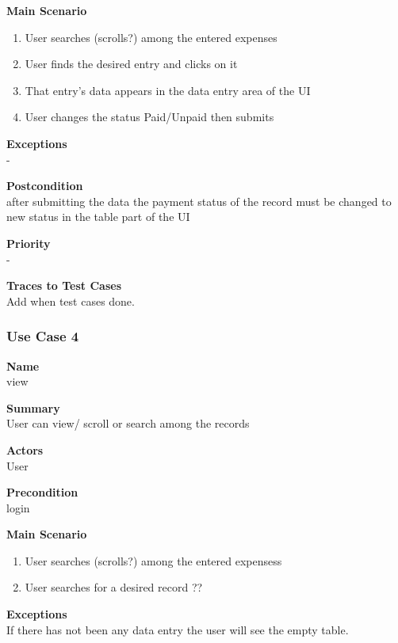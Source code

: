 \documentclass[12pt]{article}
\begin{document}
\noindent
{\bf Main Scenario}\\
\vspace*{-0.2in}
\begin{enumerate}
\item User searches (scrolls?)  among the entered expenses
\item User finds the desired entry and clicks on it
\item That entry’s data appears in the data entry area of the UI
\item User changes the status Paid/Unpaid then submits

\end{enumerate}

\noindent
{\bf Exceptions}\\
- 

\noindent
{\bf Postcondition}\\
after submitting the data the payment status of the record must be changed to new status in the table part of the UI

\noindent
{\bf Priority}\\
-

\noindent
{\bf Traces to Test Cases}\\
Add when test cases done.

\subsubsection{Use Case 4} \label{uc:1}		%

\noindent
{\bf Name}\\
view

\noindent
{\bf Summary}\\
User can view/ scroll or search among the records

\noindent
{\bf Actors}\\
User

\noindent
{\bf Precondition}\\
login

\noindent
{\bf Main Scenario}\\
\vspace*{-0.2in}
\begin{enumerate}
\item User searches (scrolls?)  among the entered expensess
\item User searches for a desired record  ??

\end{enumerate}

\noindent
{\bf Exceptions}\\
If there has not been any data entry the user will see the empty table.
\end{document}
